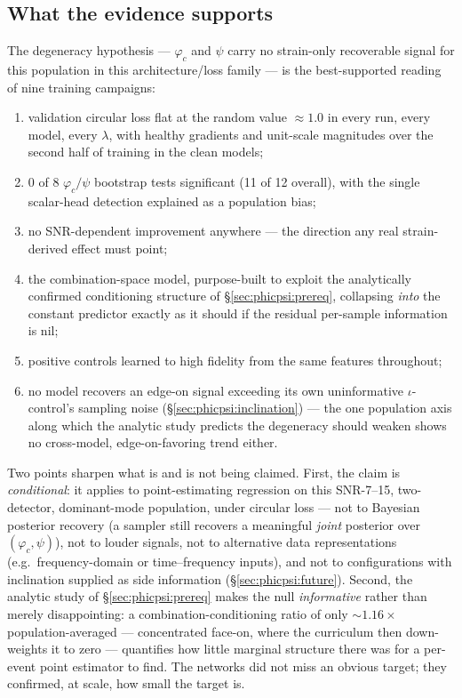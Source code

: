 \subsection{What the evidence supports}\label{subsec:what-the-evidence-supports}

The degeneracy hypothesis --- $\varphi_c$ and $\psi$ carry no strain-only recoverable signal for this population in this architecture/loss family --- is the best-supported reading of nine training campaigns:
\begin{enumerate}
\item validation circular loss flat at the random value $\approx 1.0$ in every run, every model, every $\lambda$, with healthy gradients and unit-scale magnitudes over the second half of training in the clean models;
\item 0 of 8 $\varphi_c/\psi$ bootstrap tests significant (11 of 12 overall), with the single scalar-head detection explained as a population bias;
\item no SNR-dependent improvement anywhere --- the direction any real strain-derived effect must point;
\item the combination-space model, purpose-built to exploit the analytically confirmed conditioning structure of \S\ref{sec:phicpsi:prereq}, collapsing \emph{into} the constant predictor exactly as it should if the residual per-sample information is nil;
\item positive controls learned to high fidelity from the same features throughout;
\item no model recovers an edge-on signal exceeding its own uninformative $\iota$-control's sampling noise (\S\ref{sec:phicpsi:inclination}) --- the one population axis along which the analytic study predicts the degeneracy should weaken shows no cross-model, edge-on-favoring trend either.
\end{enumerate}

Two points sharpen what is and is not being claimed.
First, the claim is \emph{conditional}: it applies to point-estimating regression on this SNR-7--15, two-detector, dominant-mode population, under circular loss --- not to Bayesian posterior recovery (a sampler still recovers a meaningful \emph{joint} posterior over $(\varphi_c, \psi)$), not to louder signals, not to alternative data representations (e.g.\ frequency-domain or time--frequency inputs), and not to configurations with inclination supplied as side information (\S\ref{sec:phicpsi:future}).
Second, the analytic study of \S\ref{sec:phicpsi:prereq} makes the null \emph{informative} rather than merely disappointing: a combination-conditioning ratio of only ${\sim}1.16\times$ population-averaged --- concentrated face-on, where the curriculum then down-weights it to zero --- quantifies how little marginal structure there was for a per-event point estimator to find.
The networks did not miss an obvious target; they confirmed, at scale, how small the target is.

